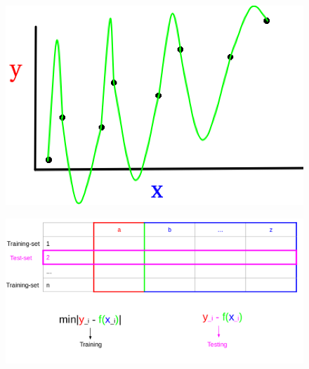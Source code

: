 \documentclass{beamer}
\begin{document}
\begin{frame}
\begin{figure}[ht!]
 \centering
 \includegraphics[scale=0.3]{f1.png}
\end{figure}
\end{frame}

\begin{frame}
 \begin{figure}[ht!]
 \centering
 \includegraphics[scale=0.3]{table3.png}
\end{figure}
\end{frame}
\end{document}

